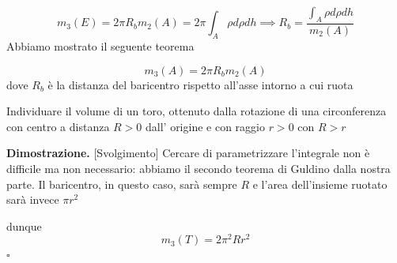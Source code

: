 $$
m_3(E) = 2 \pi R_b m_2(A) = 2 \pi \int_A \rho d\rho dh \implies R_b = \frac{\int_A \rho d\rho dh}{m_2(A)}
$$
Abbiamo mostrato il seguente teorema
%
\vspace{0.5cm}
\begin{theorem}[\textcolor{blue}{secondo teorema di Guldino}]
	$$m_3(A) = 2 \pi R_b m_2(A) $$ dove $R_b$ è la distanza del baricentro rispetto all'asse intorno a cui ruota 
\end{theorem}
%
\vspace{0.5cm}
\begin{exercise}[\textcolor{blue}{Volume del toro}]
Individuare il volume di un toro, ottenuto dalla rotazione di una circonferenza con centro a distanza $R > 0$ dall' origine e con raggio $r > 0$ con $R > r$
\end{exercise}
%
\noindent \textbf{Dimostrazione. }[Svolgimento]
Cercare di parametrizzare l'integrale non è difficile ma non necessario: abbiamo il secondo teorema di Guldino dalla nostra parte. Il baricentro, in questo caso, sarà sempre $R$ e l'area dell'insieme ruotato sarà invece $\pi r^2$
\begin{figure}
	\centering
\end{figure}
dunque
$$
m_3(T) = 2\pi^2 Rr^2
$$
\hfill $\square$
%
\vspace{0.5cm}
